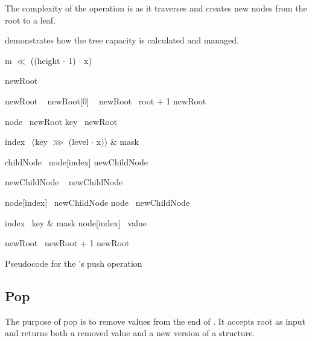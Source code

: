 The complexity of the operation is  as it traverses and creates new nodes from the root to a leaf.

 demonstrates how the tree capacity is calculated and managed.

\begin{listing}[ht!]
    \begin{algorithmic}[1]
		    \State \Return m $\ll$ ((height - 1) $\cdot$ x)
        \EndFunction

        \State

            \State newRoot \la\ \nil{}

                \State newRoot \la\ 
                \State newRoot[0] \la\ 
                \State newRoot \la\ root + 1
            \Else
                \State newRoot \la\ 
            \EndIf

            \State node \la\ newRoot
            \State key \la\ newRoot

                \State index \la\ (key $\ggg$ (level $\cdot$ x)) \& mask

                \State childNode \la\ node[index]
                \State newChildNode \la\ \nil{}

                    \State newChildNode \la\ 
                \Else
                    \State newChildNode \la\ 
                \EndIf

                \State node[index] \la\ newChildNode
                \State node \la\ newChildNode
            \EndFor

            \State index \la\ key \& mask
            \State node[index] \la\ value

            \State newRoot \la\ newRoot + 1
            \State \Return newRoot
        \EndFunction
    \end{algorithmic}

    \caption{Pseudocode for the \treerb{}'s push operation}
    \label{lst:rb-tree-push}
\end{listing}

\subsection{Pop}
The purpose of pop is to remove values from the end of \treerb{}. It accepts root as input and returns both a removed value and a new version of a structure.

